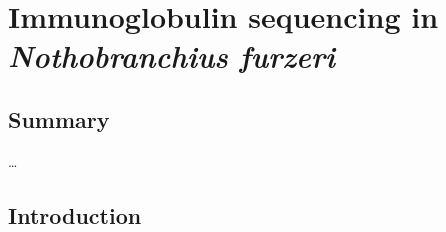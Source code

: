 
\chapter{Immunoglobulin sequencing in \textit{Nothobranchius furzeri}}  
\onehalfspacing

\section*{Summary} 

\dots
\pagebreak


\section{Introduction}



